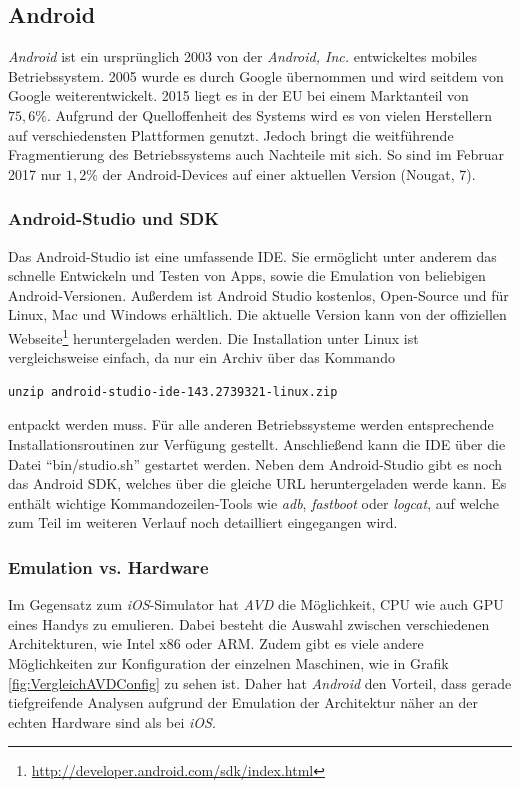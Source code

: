 		\subsection{Android}
			\textit{Android} ist ein ursprünglich 2003 von der \textit{Android, Inc.} entwickeltes mobiles Betriebssystem. 2005 wurde es durch Google übernommen und wird seitdem von Google weiterentwickelt. 2015 liegt es in der EU bei einem Marktanteil von $75,6\%$\cite{KatarWorldpanelMobBetrSys}. Aufgrund der Quelloffenheit des Systems wird es von vielen Herstellern auf verschiedensten Plattformen genutzt. Jedoch bringt die weitführende Fragmentierung des Betriebssystems auch Nachteile mit sich. So sind im Februar 2017 nur $1,2 \%$ der Android-Devices auf einer aktuellen Version (Nougat, 7).\cite{StatistaAndroidVersionen}\cite{Drake2014}
			
			\subsubsection{Android-Studio und SDK}
			Das Android-Studio ist eine umfassende IDE. Sie ermöglicht unter anderem das schnelle Entwickeln und Testen von Apps, sowie die Emulation von beliebigen Android-Versionen. Außerdem ist Android Studio kostenlos, Open-Source und für Linux, Mac und Windows erhältlich. Die aktuelle Version kann von der offiziellen Webseite\footnote{\url{http://developer.android.com/sdk/index.html}} heruntergeladen werden. Die Installation unter Linux ist vergleichsweise einfach, da nur ein Archiv über das Kommando 
\begin{lstlisting}
unzip android-studio-ide-143.2739321-linux.zip
\end{lstlisting}
entpackt werden muss. Für alle anderen Betriebssysteme werden entsprechende Installationsroutinen zur Verfügung gestellt. Anschließend kann die IDE über die Datei "`bin/studio.sh"' gestartet werden. Neben dem Android-Studio gibt es noch das Android SDK, welches über die gleiche URL heruntergeladen werde kann. Es enthält wichtige Kommandozeilen-Tools wie \textit{adb}, \textit{fastboot} oder \textit{logcat}, auf welche zum Teil im weiteren Verlauf noch detailliert eingegangen wird.

			
			\subsubsection{Emulation vs. Hardware}
			Im Gegensatz zum \textit{iOS}-Simulator hat \textit{AVD} die Möglichkeit, CPU wie auch GPU eines Handys zu emulieren. Dabei besteht die Auswahl zwischen verschiedenen Architekturen, wie Intel x86 oder ARM. Zudem gibt es viele andere Möglichkeiten zur Konfiguration der einzelnen Maschinen, wie in Grafik \ref{fig:VergleichAVDConfig} zu sehen ist. Daher hat \textit{Android} den Vorteil, dass gerade tiefgreifende Analysen aufgrund der Emulation der Architektur näher an der echten Hardware sind als bei \textit{iOS}.\cite{Drake2014}
			
